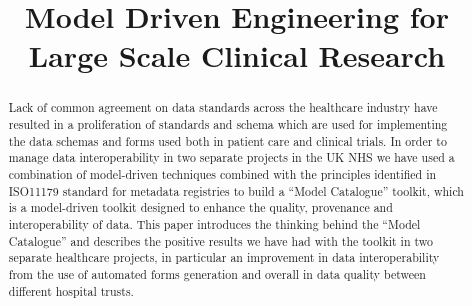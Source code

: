 \documentclass[conference]{IEEEtran}
\begin{document}
 


\title{Model Driven Engineering for \\ Large Scale Clinical Research}

\vskip 4mm 

\author{
}
\ifpdf
\graphicspath{{ASEFigs/}}
\fi

\maketitle

\begin{abstract}
Lack of common agreement on data standards across the healthcare industry have resulted in a proliferation of standards and schema which are used for implementing the data schemas and forms used both in patient care and clinical trials. In order to manage data interoperability in two separate projects in the UK NHS we have used a combination of model-driven techniques combined with the principles identified in ISO11179 standard for metadata registries to build a “Model Catalogue” toolkit, which is a model-driven toolkit designed to enhance the quality, provenance and interoperability of data. This paper introduces the thinking behind the “Model Catalogue” and describes the positive results we have had with the toolkit in two separate healthcare projects, in particular an improvement in data interoperability from the use of automated forms generation and overall in data quality between different hospital trusts.

\end{abstract}

\vskip 14mm

\noindent






 


\newpage




\end{document}
